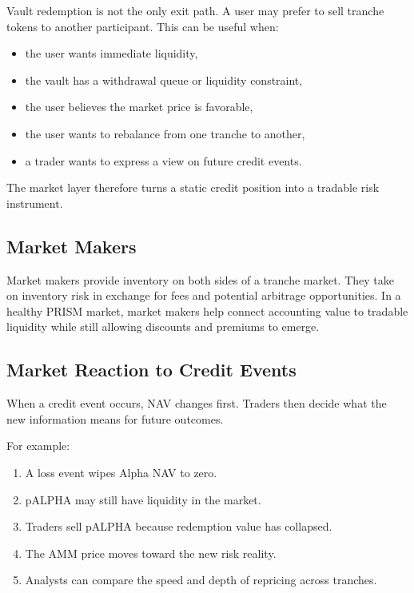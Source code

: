 \documentclass[11pt]{article}
\begin{document}
Vault redemption is not the only exit path. A user may prefer to sell tranche
tokens to another participant. This can be useful when:

\begin{itemize}
  \item the user wants immediate liquidity,
  \item the vault has a withdrawal queue or liquidity constraint,
  \item the user believes the market price is favorable,
  \item the user wants to rebalance from one tranche to another,
  \item a trader wants to express a view on future credit events.
\end{itemize}

The market layer therefore turns a static credit position into a tradable risk
instrument.

\subsection{Market Makers}

Market makers provide inventory on both sides of a tranche market. They take on
inventory risk in exchange for fees and potential arbitrage opportunities. In a
healthy PRISM market, market makers help connect accounting value to tradable
liquidity while still allowing discounts and premiums to emerge.

\subsection{Market Reaction to Credit Events}

When a credit event occurs, NAV changes first. Traders then decide what the new
information means for future outcomes.

For example:

\begin{enumerate}
  \item A loss event wipes Alpha NAV to zero.
  \item pALPHA may still have liquidity in the market.
  \item Traders sell pALPHA because redemption value has collapsed.
  \item The AMM price moves toward the new risk reality.
  \item Analysts can compare the speed and depth of repricing across tranches.
\end{enumerate}
\end{document}
